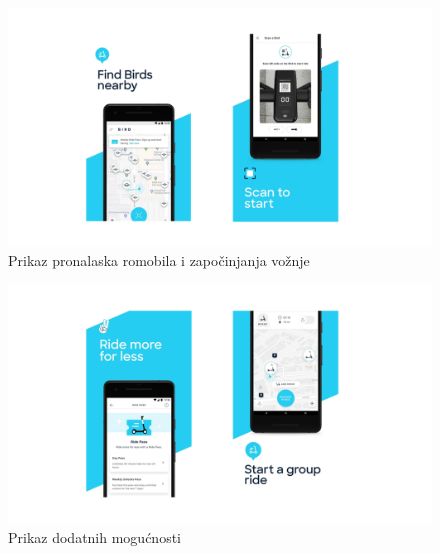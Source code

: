 	

		\begin{figure} [H]
			
			\includegraphics[width=1\linewidth]{slike/BirdApp1.png}
			\centering
			\caption{Prikaz pronalaska romobila i započinjanja vožnje}
			\label{fig:Prikaz pronalaska romobila i započinjanja vožnje}
		\end{figure}
		
		\begin{figure} [H]
			
			\includegraphics[width=1\linewidth]{slike/BirdApp2.png}
			\centering
			\caption{Prikaz dodatnih mogućnosti}
			\label{fig:Prikaz dodatnih mogućnosti}
		\end{figure}
		
		
		
		
		
		
		
	